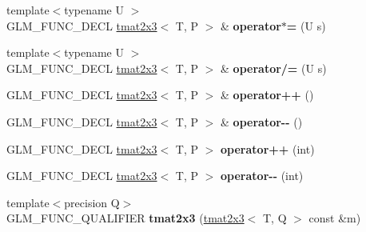 \begin{DoxyCompactItemize}
\item 
{\footnotesize template$<$typename U $>$ }\\G\+L\+M\+\_\+\+F\+U\+N\+C\+\_\+\+D\+E\+CL \hyperlink{structglm_1_1detail_1_1tmat2x3}{tmat2x3}$<$ T, P $>$ \& {\bfseries operator$\ast$=} (U s)\hypertarget{structglm_1_1detail_1_1tmat2x3_aa37d03f6278f001ac2ece38115148bdd}{}\label{structglm_1_1detail_1_1tmat2x3_aa37d03f6278f001ac2ece38115148bdd}

\item 
{\footnotesize template$<$typename U $>$ }\\G\+L\+M\+\_\+\+F\+U\+N\+C\+\_\+\+D\+E\+CL \hyperlink{structglm_1_1detail_1_1tmat2x3}{tmat2x3}$<$ T, P $>$ \& {\bfseries operator/=} (U s)\hypertarget{structglm_1_1detail_1_1tmat2x3_a3687e511d47d156bb7546102d28fa2f7}{}\label{structglm_1_1detail_1_1tmat2x3_a3687e511d47d156bb7546102d28fa2f7}

\item 
G\+L\+M\+\_\+\+F\+U\+N\+C\+\_\+\+D\+E\+CL \hyperlink{structglm_1_1detail_1_1tmat2x3}{tmat2x3}$<$ T, P $>$ \& {\bfseries operator++} ()\hypertarget{structglm_1_1detail_1_1tmat2x3_a633e1c5afab2a44f0692e5c71fbba424}{}\label{structglm_1_1detail_1_1tmat2x3_a633e1c5afab2a44f0692e5c71fbba424}

\item 
G\+L\+M\+\_\+\+F\+U\+N\+C\+\_\+\+D\+E\+CL \hyperlink{structglm_1_1detail_1_1tmat2x3}{tmat2x3}$<$ T, P $>$ \& {\bfseries operator-\/-\/} ()\hypertarget{structglm_1_1detail_1_1tmat2x3_a794f237071edb867947ac54de6fa9545}{}\label{structglm_1_1detail_1_1tmat2x3_a794f237071edb867947ac54de6fa9545}

\item 
G\+L\+M\+\_\+\+F\+U\+N\+C\+\_\+\+D\+E\+CL \hyperlink{structglm_1_1detail_1_1tmat2x3}{tmat2x3}$<$ T, P $>$ {\bfseries operator++} (int)\hypertarget{structglm_1_1detail_1_1tmat2x3_a36ac4254a3ce5982afcf1330a675a973}{}\label{structglm_1_1detail_1_1tmat2x3_a36ac4254a3ce5982afcf1330a675a973}

\item 
G\+L\+M\+\_\+\+F\+U\+N\+C\+\_\+\+D\+E\+CL \hyperlink{structglm_1_1detail_1_1tmat2x3}{tmat2x3}$<$ T, P $>$ {\bfseries operator-\/-\/} (int)\hypertarget{structglm_1_1detail_1_1tmat2x3_abbbbcd9db53e635fc2537666fe766b03}{}\label{structglm_1_1detail_1_1tmat2x3_abbbbcd9db53e635fc2537666fe766b03}

\item 
{\footnotesize template$<$precision Q$>$ }\\G\+L\+M\+\_\+\+F\+U\+N\+C\+\_\+\+Q\+U\+A\+L\+I\+F\+I\+ER {\bfseries tmat2x3} (\hyperlink{structglm_1_1detail_1_1tmat2x3}{tmat2x3}$<$ T, Q $>$ const \&m)\hypertarget{structglm_1_1detail_1_1tmat2x3_ad87db0132efbb006cabcb3a833c516ba}{}\label{structglm_1_1detail_1_1tmat2x3_ad87db0132efbb006cabcb3a833c516ba}


\end{DoxyCompactItemize}
